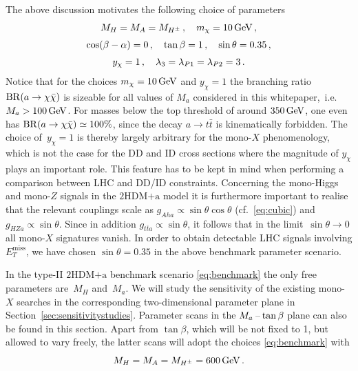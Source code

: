 \documentclass[a4paper, 11pt,notoc]{article}
\newcommand{\MET}{\ensuremath{E_T^\mathrm{miss}}\xspace}
\newcommand{\hdma}{\ensuremath{\textrm{2HDM+a}}\xspace}
\begin{document}
The above discussion motivates the following choice of parameters
\begin{gather} 
 M_H  = M_A = M_{H^\pm} \,, \quad m_\chi = 10 \, {\rm GeV} \,,\notag  \\[1mm]
\cos (\beta - \alpha) = 0\,, \quad   \tan \beta = 1\,, \quad  \sin\theta = 0.35\,, \label{eq:benchmark} \\[1mm]
y_\chi  = 1\,, \quad \lambda_3 =  \lambda_{P1} = \lambda_{P2} =3 \,. \notag 
\end{gather}
Notice that for the choices $m_\chi = 10 \, {\rm GeV}$ and $y_\chi  = 1$ the  branching ratio ${\rm BR} (a \to \chi \bar \chi)$ is sizeable for all values of $M_a$ considered in this whitepaper,~i.e.~$M_a > 100 \, {\rm GeV}$. For masses below the top threshold of around $350 \, {\rm GeV}$, one even has ${\rm BR} (a \to \chi \bar \chi) \simeq 100\%$, since the decay $a \to t \bar t$ is  kinematically forbidden.  The choice of~$y_\chi  = 1$ is thereby largely arbitrary for the mono-$X$ phenomenology, which is not the case for the DD and ID cross sections where the magnitude of $y_\chi$ plays an important role. This feature  has to be  kept in mind when performing a comparison between LHC and DD/ID constraints. Concerning the mono-Higgs and mono-$Z$ signals in the \hdma model it is furthermore important to realise that the relevant couplings scale as $g_{Aha} \propto \sin \theta \cos \theta$  (cf.~\eqref{eq:cubic}) and $g_{HZa} \propto \sin \theta$. Since in addition $g_{t \bar t a} \propto \sin \theta$,  it follows that in the limit~$\sin \theta \to 0$ all mono-$X$ signatures vanish. In order to obtain detectable LHC signals involving $\MET$, we have chosen $\sin\theta = 0.35$ in the above benchmark parameter scenario. 

In the  type-II \hdma  benchmark scenario \eqref{eq:benchmark} the only free parameters are~$M_H$ and~$M_a$. We will study the sensitivity of the existing mono-$X$ searches in the corresponding two-dimensional parameter plane in Section~\ref{sec:sensitivitystudies}. Parameter scans in the $M_a\hspace{0.5mm}$--$\hspace{0.5mm}\tan \beta$ plane can also be found in this section.  Apart from $\tan \beta$, which will be not fixed to 1, but allowed to vary freely, the latter  scans  will adopt the choices \eqref{eq:benchmark} with  
\begin{equation} \label{eq:matbscan}
M_H  = M_A = M_{H^\pm} =  600 \, {\rm GeV} \,.
\end{equation} 
\end{document}
